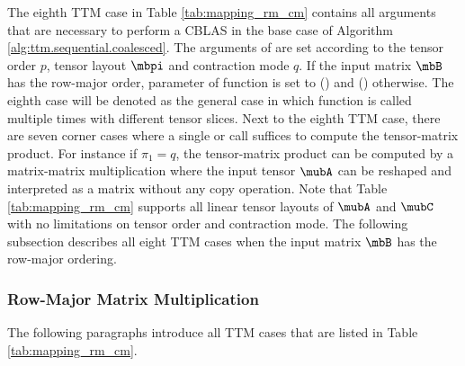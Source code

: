 The eighth TTM case in Table \ref{tab:mapping_rm_cm} contains all arguments that are necessary to perform a CBLAS  in the base case of Algorithm \ref{alg:ttm.sequential.coalesced}.
The arguments of  are set according to the tensor order $p$, tensor layout $\mbpi$ and contraction mode $q$.
If the input matrix $\mbB$ has the row-major order, parameter  of function  is set to  () and  () otherwise.
The eighth case will be denoted as the general case in which function  is called multiple times with different tensor slices.
Next to the eighth TTM case, there are seven corner cases where a single  or  call suffices to compute the tensor-matrix product.
For instance if $\pi_1 = q$, the tensor-matrix product can be computed by a matrix-matrix multiplication where the input tensor $\mubA$ can be reshaped and interpreted as a matrix without any copy operation.
Note that Table \ref{tab:mapping_rm_cm} supports all linear tensor layouts of $\mubA$ and $\mubC$ with no limitations on tensor order and contraction mode.
The following subsection describes all eight TTM cases when the input matrix $\mbB$ has the row-major ordering.





\subsubsection{Row-Major Matrix Multiplication}
The following paragraphs introduce all TTM cases that are listed in Table \ref{tab:mapping_rm_cm}.

